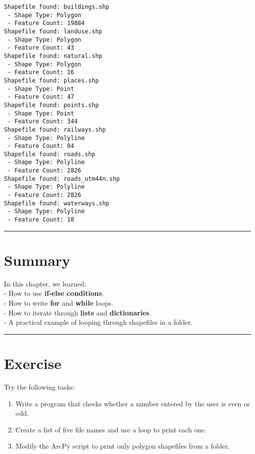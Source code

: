 \documentclass[
  11pt,
  letterpaper,
]{book}
\providecommand{\tightlist}{%
  \setlength{\itemsep}{0pt}\setlength{\parskip}{0pt}}
\begin{document}
\begin{verbatim}
Shapefile found: buildings.shp
 - Shape Type: Polygon
 - Feature Count: 19884
Shapefile found: landuse.shp
 - Shape Type: Polygon
 - Feature Count: 43
Shapefile found: natural.shp
 - Shape Type: Polygon
 - Feature Count: 16
Shapefile found: places.shp
 - Shape Type: Point
 - Feature Count: 47
Shapefile found: points.shp
 - Shape Type: Point
 - Feature Count: 344
Shapefile found: railways.shp
 - Shape Type: Polyline
 - Feature Count: 84
Shapefile found: roads.shp
 - Shape Type: Polyline
 - Feature Count: 2826
Shapefile found: roads_utm44n.shp
 - Shape Type: Polyline
 - Feature Count: 2826
Shapefile found: waterways.shp
 - Shape Type: Polyline
 - Feature Count: 18
\end{verbatim}

\begin{center}\rule{0.5\linewidth}{0.5pt}\end{center}

\section{Summary}\label{summary-2}

In this chapter, we learned:\\
- How to use \textbf{if-else conditions}.\\
- How to write \textbf{for} and \textbf{while} loops.\\
- How to iterate through \textbf{lists} and \textbf{dictionaries}.\\
- A practical example of looping through shapefiles in a folder.

\begin{center}\rule{0.5\linewidth}{0.5pt}\end{center}

\section{Exercise}\label{exercise-2}

Try the following tasks:

\begin{enumerate}
\def\labelenumi{\arabic{enumi}.}
\tightlist
\item
  Write a program that checks whether a number entered by the user is
  even or odd.\\
\item
  Create a list of five file names and use a loop to print each one.\\
\item
  Modify the ArcPy script to print only polygon shapefiles from a
  folder.
\end{enumerate}
\end{document}
